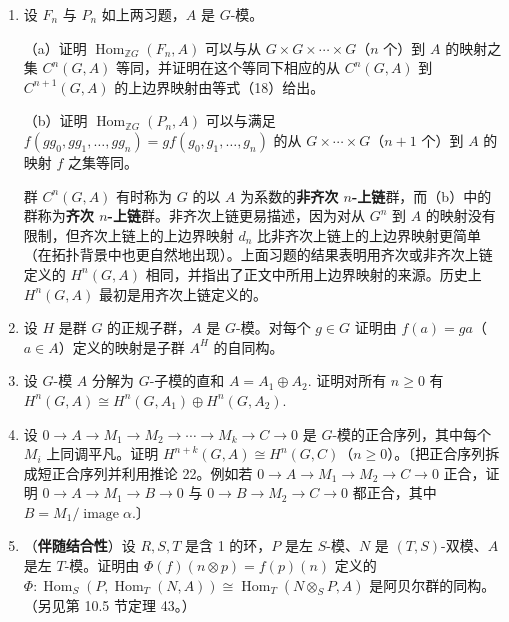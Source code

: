 \begin{enumerate}
（d）证明若对所有 \(g_0 \in G\) 有 \(\varepsilon(g_0) = 1\)，则所得的复形是 \(\mathbb{Z}\) 的自由 \(G\)-模分解。〔证明（c）中的同构把上一习题的 \(G\)-模分解（\*\*）与（\*）互相映为对方。〕

\item 设 \(F_n\) 与 \(P_n\) 如上两习题，\(A\) 是 \(G\)-模。

（a）证明 \(\operatorname{Hom}_{\mathbb{Z}G}(F_n, A)\) 可以与从 \(G \times G \times \cdots \times G\)（\(n\) 个）到 \(A\) 的映射之集 \(C^n(G, A)\) 等同，并证明在这个等同下相应的从 \(C^n(G, A)\) 到 \(C^{n+1}(G, A)\) 的上边界映射由等式（18）给出。

（b）证明 \(\operatorname{Hom}_{\mathbb{Z}G}(P_n, A)\) 可以与满足 \(f(gg_0, gg_1, \ldots, gg_n) = gf(g_0, g_1, \ldots, g_n)\) 的从 \(G \times \cdots \times G\)（\(n+1\) 个）到 \(A\) 的映射 \(f\) 之集等同。

\noindent 群 \(C^n(G, A)\) 有时称为 \(G\) 的以 \(A\) 为系数的\textbf{非齐次 \(n\)-上链}群，而（b）中的群称为\textbf{齐次 \(n\)-上链}群。非齐次上链更易描述，因为对从 \(G^n\) 到 \(A\) 的映射没有限制，但齐次上链上的上边界映射 \(d_n\) 比非齐次上链上的上边界映射更简单（在拓扑背景中也更自然地出现）。上面习题的结果表明用齐次或非齐次上链定义的 \(H^n(G, A)\) 相同，并指出了正文中所用上边界映射的来源。历史上 \(H^n(G, A)\) 最初是用齐次上链定义的。

\item 设 \(H\) 是群 \(G\) 的正规子群，\(A\) 是 \(G\)-模。对每个 \(g \in G\) 证明由 \(f(a) = ga\)（\(a \in A\)）定义的映射是子群 \(A^H\) 的自同构。

\item 设 \(G\)-模 \(A\) 分解为 \(G\)-子模的直和 \(A = A_1 \oplus A_2\). 证明对所有 \(n \geq 0\) 有 \(H^n(G, A) \cong H^n(G, A_1) \oplus H^n(G, A_2)\).

\item 设 \(0 \to A \to M_1 \to M_2 \to \cdots \to M_k \to C \to 0\) 是 \(G\)-模的正合序列，其中每个 \(M_i\) 上同调平凡。证明 \(H^{n+k}(G, A) \cong H^n(G, C)\)（\(n \geq 0\)）。〔把正合序列拆成短正合序列并利用推论 22。例如若 \(0 \to A \to M_1 \to M_2 \to C \to 0\) 正合，证明 \(0 \to A \to M_1 \to B \to 0\) 与 \(0 \to B \to M_2 \to C \to 0\) 都正合，其中 \(B = M_1/\operatorname{image}\alpha\).〕

\item （\textbf{伴随结合性}）设 \(R, S, T\) 是含 1 的环，\(P\) 是左 \(S\)-模、\(N\) 是 \((T,S)\)-双模、\(A\) 是左 \(T\)-模。证明由 \(\Phi(f)(n \otimes p) = f(p)(n)\) 定义的 \(\Phi : \operatorname{Hom}_S(P, \operatorname{Hom}_T(N, A)) \cong \operatorname{Hom}_T(N \otimes_SP, A)\) 是阿贝尔群的同构。（另见第 10.5 节定理 43。）


\end{enumerate}
